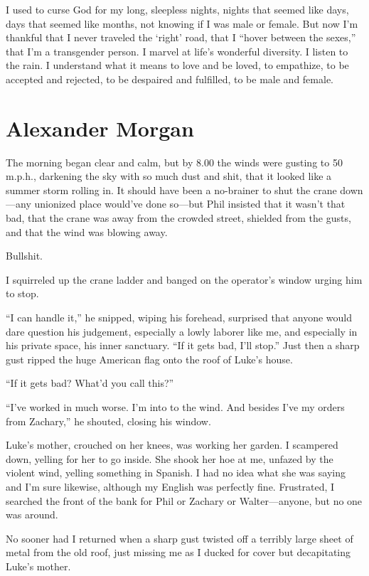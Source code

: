I used to curse God for my long, sleepless nights, nights that seemed
like days, days that seemed like months, not knowing if I was male or
female. But now I'm thankful that I never traveled the `right' road,
that I ``hover between the sexes,'' that I'm a transgender person. I
marvel at life's wonderful diversity. I listen to the rain. I understand
what it means to love and be loved, to empathize, to be accepted and
rejected, to be despaired and fulfilled, to be male and female.

\chapter{Alexander Morgan}

\titlemark

The morning began clear and calm, but by 8.00 the winds were gusting to
50 m.p.h., darkening the sky with so much dust and shit, that it looked
like a summer storm rolling in. It should have been a no-brainer to shut
the crane down---any unionized place would've done so---but Phil
insisted that it wasn't that bad, that the crane was away from the
crowded street, shielded from the gusts, and that the wind was blowing
away.

Bullshit.

I squirreled up the crane ladder and banged on the operator's window
urging him to stop.

``I can handle it,'' he snipped, wiping his forehead, surprised that
anyone would dare question his judgement, especially a lowly laborer
like me, and especially in his private space, his inner sanctuary. ``If
it gets bad, I'll stop.'' Just then a sharp gust ripped the huge
American flag onto the roof of Luke's house.

``If it gets bad? What'd you call this?''

``I've worked in much worse. I'm into to the wind. And besides I've my
orders from Zachary,'' he shouted, closing his window.

Luke's mother, crouched on her knees, was working her garden. I
scampered down, yelling for her to go inside. She shook her hoe at me,
unfazed by the violent wind, yelling something in Spanish. I had no idea
what she was saying and I'm sure likewise, although my English was
perfectly fine. Frustrated, I searched the front of the bank for Phil or
Zachary or Walter---anyone, but no one was around.

No sooner had I returned when a sharp gust twisted off a terribly large
sheet of metal from the old roof, just missing me as I ducked for cover
but decapitating Luke's mother.

